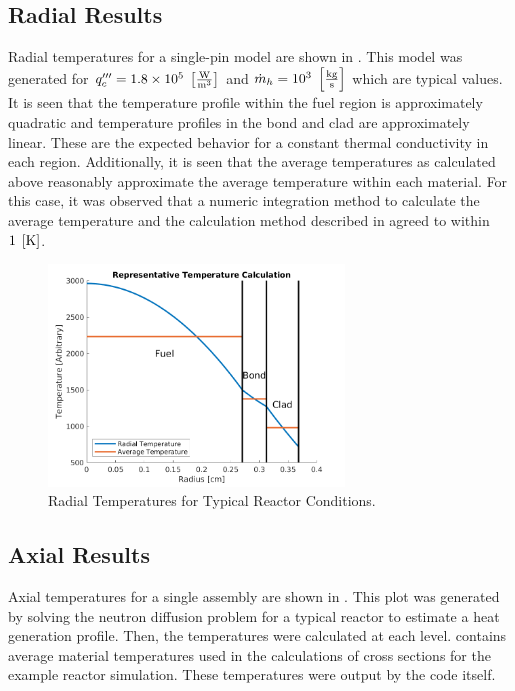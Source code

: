   \subsection{Radial Results}
    Radial temperatures for a single-pin model are shown in
    . This model was generated for $q'''_c = 1.8
    \times 10^5 \;\left[\text{{$\frac{\text{W}}{\text{m}^3}$}}\right]$ and $\dot{m}_h = 10^3
    \;\left[\text{{$\frac{\text{kg}}{\text{s}}$}}\right]$ which are typical values. It is seen
    that the temperature profile within the fuel region is approximately 
    quadratic and temperature profiles in the bond and clad are approximately
    linear. These are the expected behavior for a constant thermal conductivity
    in each region. Additionally, it is seen that the average temperatures as
    calculated above reasonably approximate the average temperature within each
    material. For this case, it was observed that a numeric integration method
    to calculate the average temperature and the calculation method described in
     agreed to within $1 \;\left[\text{{K}}\right]$.

    \begin{figure}
      \centering
      \includegraphics[width=0.7\textwidth]{radial_temp_plot}
      \caption{Radial Temperatures for Typical Reactor Conditions.}
      \label{fig:radial_temp_plot}
    \end{figure}

  \subsection{Axial Results}
    Axial temperatures for a single assembly are shown in
    . This plot was generated by solving the neutron
    diffusion problem for a typical reactor to estimate a heat generation
    profile. Then, the temperatures were calculated at each level.
     contains average material temperatures used in
    the calculations of cross sections for the example reactor simulation. These
    temperatures were output by the code itself.

